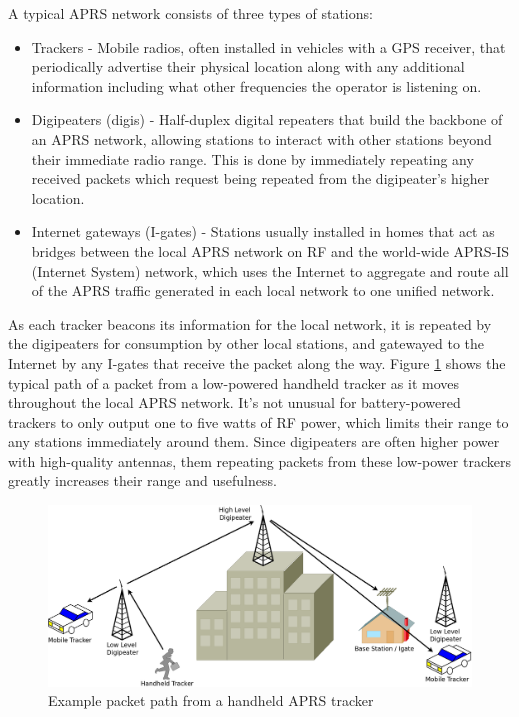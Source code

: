 A typical APRS network consists of three types of stations:
\begin{itemize}
	\item Trackers - Mobile radios, often installed in vehicles with
		a GPS receiver, that periodically advertise their physical location
		along with any additional information including what other frequencies
		the operator is listening on.
	\item Digipeaters (digis) - Half-duplex digital repeaters that build the
		backbone of an APRS network, allowing stations to interact with other
		stations beyond their immediate radio range. This is done by immediately
		repeating any received packets which request being repeated from the
		digipeater's higher location. 
	\item Internet gateways (I-gates) - Stations usually installed in homes
		that act as bridges between the local APRS network on RF and the
		world-wide APRS-IS (Internet System) network, which uses the Internet
		to aggregate and route all of the APRS traffic generated in each
		local network to one unified network.
\end{itemize} 

As each tracker beacons its information for the local network, it is repeated
by the digipeaters for consumption by other local stations, and gatewayed
to the Internet by any I-gates that receive the packet along the way. 
Figure \ref{fig:demonetwork}
shows the typical path of a packet from a low-powered handheld tracker as it moves
throughout the local APRS network. It's not unusual for battery-powered trackers to
only output one to five watts of RF power, which limits their range to any stations
immediately around them. 
Since digipeaters are often higher power with 
high-quality antennas, them repeating packets from these low-power trackers 
greatly increases their range and usefulness.

\begin{figure}
	\centering
	\includegraphics[width=1.0\textwidth]{src/dia/demonetwork}
	\caption{Example packet path from a handheld APRS tracker}
	\label{fig:demonetwork}
\end{figure}

